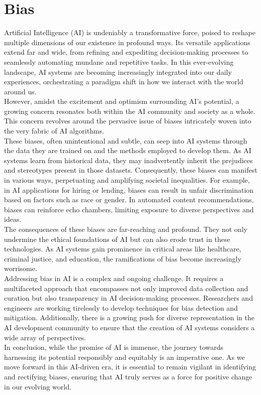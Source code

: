 \documentclass[12pt,a4paper,openright,twoside]{book}
\begin{document}
\section{Bias}
Artificial Intelligence (AI) is undeniably a transformative force, poised to reshape multiple dimensions of our existence in profound ways. Its versatile applications extend far and wide, from refining and expediting decision-making processes to seamlessly automating mundane and repetitive tasks. In this ever-evolving landscape, AI systems are becoming increasingly integrated into our daily experiences, orchestrating a paradigm shift in how we interact with the world around us. \\
However, amidst the excitement and optimism surrounding AI's potential, a growing concern resonates both within the AI community and society as a whole. This concern revolves around the pervasive issue of biases intricately woven into the very fabric of AI algorithms. \\
These biases, often unintentional and subtle, can seep into AI systems through the data they are trained on and the methods employed to develop them. As AI systems learn from historical data, they may inadvertently inherit the prejudices and stereotypes present in those datasets. Consequently, these biases can manifest in various ways, perpetuating and amplifying societal inequalities. For example, in AI applications for hiring or lending, biases can result in unfair discrimination based on factors such as race or gender. In automated content recommendations, biases can reinforce echo chambers, limiting exposure to diverse perspectives and ideas. \\
The consequences of these biases are far-reaching and profound. They not only undermine the ethical foundations of AI but can also erode trust in these technologies. As AI systems gain prominence in critical areas like healthcare, criminal justice, and education, the ramifications of bias become increasingly worrisome. \\
Addressing bias in AI is a complex and ongoing challenge. It requires a multifaceted approach that encompasses not only improved data collection and curation but also transparency in AI decision-making processes. Researchers and engineers are working tirelessly to develop techniques for bias detection and mitigation. Additionally, there is a growing push for diverse representation in the AI development community to ensure that the creation of AI systems considers a wide array of perspectives. \\
In conclusion, while the promise of AI is immense, the journey towards harnessing its potential responsibly and equitably is an imperative one. As we move forward in this AI-driven era, it is essential to remain vigilant in identifying and rectifying biases, ensuring that AI truly serves as a force for positive change in our evolving world. \cite{10.1145/3308560.3317590}
\end{document}
